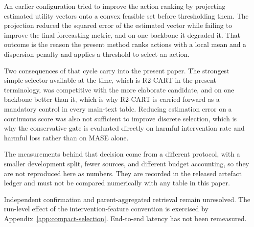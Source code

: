 \documentclass{article}
\begin{document}
An earlier configuration tried to improve the action ranking by projecting estimated utility
vectors onto a convex feasible set before thresholding them. The projection reduced the squared
error of the estimated vector while failing to improve the final forecasting metric, and on one
backbone it degraded it. That outcome is the reason the present method ranks actions with a
local mean and a dispersion penalty and applies a threshold to select an action.

Two consequences of that cycle carry into the present paper. The strongest simple selector
available at the time, which is R2-CART in the present terminology, was competitive with the
more elaborate candidate, and on one backbone better than it, which is why R2-CART is carried
forward as a mandatory control in every main-text table. Reducing estimation error on a
continuous score was also not sufficient to improve discrete selection, which is why the
conservative gate is evaluated directly on harmful intervention rate and harmful loss rather
than on MASE alone.

The measurements behind that decision come from a different protocol, with a smaller
development split, fewer sources, and different budget accounting, so they are not reproduced
here as numbers. They are recorded in the released artefact ledger and must not be compared
numerically with any table in this paper.

Independent confirmation and parent-aggregated retrieval remain unresolved. The run-level
effect of the intervention-feature convention is exercised by
Appendix~\ref{app:compact-selection}. End-to-end latency has not been remeasured.
\end{document}
